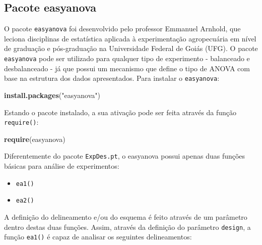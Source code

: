 \documentclass[
]{article}
\newenvironment{Shaded}{\begin{snugshade}}{\end{snugshade}}
\newcommand{\KeywordTok}[1]{\textcolor[rgb]{0.13,0.29,0.53}{\textbf{#1}}}
\newcommand{\NormalTok}[1]{#1}
\newcommand{\StringTok}[1]{\textcolor[rgb]{0.31,0.60,0.02}{#1}}
\providecommand{\tightlist}{%
  \setlength{\itemsep}{0pt}\setlength{\parskip}{0pt}}
\begin{document}
\hypertarget{pacote-easyanova}{%
\subsection{Pacote easyanova}\label{pacote-easyanova}}

O pacote \texttt{easyanova} foi desenvolvido pelo professor Emmanuel Arnhold, que leciona disciplinas de estatística aplicada à experimentação agropecuária em nível de graduação e pós-graduação na Universidade Federal de Goiás (UFG). O pacote \texttt{easyanova} pode ser utilizado para qualquer tipo de experimento - balanceado e desbalanceado - já que possui um mecanismo que define o tipo de ANOVA com base na estrutura dos dados apresentados. Para instalar o \texttt{easyanova}:

\begin{Shaded}
\begin{Highlighting}[]
\KeywordTok{install.packages}\NormalTok{(}\StringTok{"easyanova"}\NormalTok{)}
\end{Highlighting}
\end{Shaded}

Estando o pacote instalado, a sua ativação pode ser feita através da função \texttt{require()}:

\begin{Shaded}
\begin{Highlighting}[]
\KeywordTok{require}\NormalTok{(easyanova)}
\end{Highlighting}
\end{Shaded}

Diferentemente do pacote \texttt{ExpDes.pt}, o easyanova possui apenas duas funções básicas para análise de experimentos:

\begin{itemize}
\tightlist
\item
  \texttt{ea1()}
\item
  \texttt{ea2()}
\end{itemize}

A definição do delineamento e/ou do esquema é feito através de um parâmetro dentro destas duas funções. Assim, através da definição do parâmetro \texttt{design}, a função \texttt{ea1()} é capaz de analisar os seguintes delineamentos:
\end{document}
